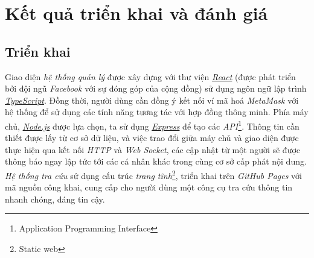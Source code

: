 \newpage
\section{Kết quả triển khai và đánh giá}

\subsection*{Triển khai}

Giao diện \textit{hệ thống quản lý} được xây dựng với thư viện \href{https://reactjs.org}{\textit{React}} (được phát triển bởi đội ngũ \textit{Facebook} với sự đóng góp của cộng đồng) sử dụng ngôn ngữ lập trình \href{https://www.typescriptlang.org/}{\textit{TypeScript}}. Đồng thời, người dùng cần đồng ý kết nối ví mã hoá \textit{MetaMask} với hệ thống để sử dụng các tính năng tương tác với hợp đồng thông minh. Phía máy chủ, \href{https://nodejs.org}{\textit{Node.js}} được lựa chọn, ta sử dụng \href{https://expressjs.com/}{\textit{Express}} để tạo các \textit{API}\footnote{Application Programming Interface}. Thông tin cần thiết được lấy từ cơ sở dữ liệu, và việc trao đổi giữa máy chủ và giao diện được thực hiện qua kết nối \textit{HTTP} và \textit{Web Socket}, các cập nhật từ một người sẽ được thông báo ngay lập tức tới các cá nhân khác trong cùng cơ sở cấp phát nội dung.\\

\textit{Hệ thống tra cứu} sử dụng cấu trúc \textit{trang tĩnh}\footnote{Static web}, triển khai trên \textit{GitHub Pages} với mã nguồn công khai, cung cấp cho người dùng một công cụ tra cứu thông tin nhanh chóng, đáng tin cậy.